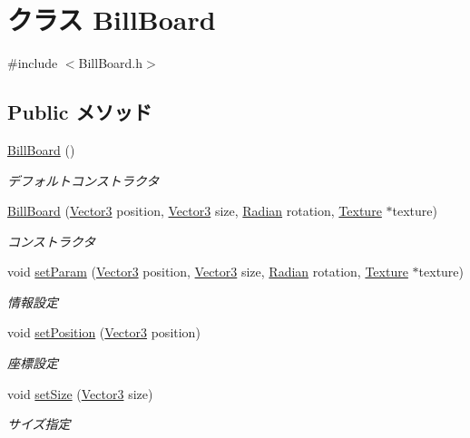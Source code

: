 \hypertarget{class_bill_board}{\section{クラス Bill\-Board}
\label{class_bill_board}
}


{\ttfamily \#include $<$Bill\-Board.\-h$>$}

\subsection*{Public メソッド}
\begin{DoxyCompactItemize}
\item 
\hyperlink{class_bill_board_aa730c8b6918f29714e5e2ac2156b6978}{Bill\-Board} ()
\begin{DoxyCompactList}\small\item\em デフォルトコンストラクタ \end{DoxyCompactList}\item 
\hyperlink{class_bill_board_a7ac5e25916b05804b33adeeb3c82af27}{Bill\-Board} (\hyperlink{struct_vector3}{Vector3} position, \hyperlink{struct_vector3}{Vector3} size, \hyperlink{class_radian}{Radian} rotation, \hyperlink{class_texture}{Texture} $\ast$texture)
\begin{DoxyCompactList}\small\item\em コンストラクタ \end{DoxyCompactList}\item 
void \hyperlink{class_bill_board_a555e9e1591b5149f582230b2864b61ac}{set\-Param} (\hyperlink{struct_vector3}{Vector3} position, \hyperlink{struct_vector3}{Vector3} size, \hyperlink{class_radian}{Radian} rotation, \hyperlink{class_texture}{Texture} $\ast$texture)
\begin{DoxyCompactList}\small\item\em 情報設定 \end{DoxyCompactList}\item 
void \hyperlink{class_bill_board_aa1c01f7180f1ddfa9168fb6edcf95df3}{set\-Position} (\hyperlink{struct_vector3}{Vector3} position)
\begin{DoxyCompactList}\small\item\em 座標設定 \end{DoxyCompactList}\item 
void \hyperlink{class_bill_board_a221457728901be0fa75964ed8da003f1}{set\-Size} (\hyperlink{struct_vector3}{Vector3} size)
\begin{DoxyCompactList}\small\item\em サイズ指定 \end{DoxyCompactList}\item 

\end{DoxyCompactItemize}
